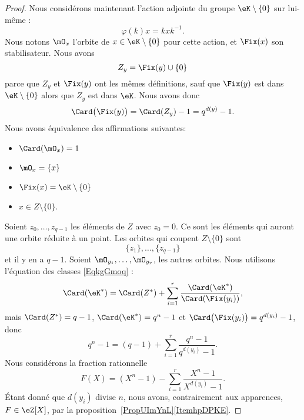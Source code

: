 \begin{proof}
	Nous considérons maintenant l'action adjointe du groupe \( \eK\setminus\{ 0 \}\) sur lui-même :
	\begin{equation}
		\varphi(k)x=kxk^{-1}.
	\end{equation}
	Nous notons \( \mO_x\) l'orbite de \( x\in \eK\setminus\{ 0 \}\) pour cette action, et \( \Fix(x)\) son stabilisateur. Nous avons
	\begin{equation}
		Z_y=\Fix(y)\cup\{ 0 \}
	\end{equation}
	parce que \( Z_y\) et \( \Fix(y)\) ont les mêmes définitions, sauf que \( \Fix(y)\) est dans \( \eK\setminus\{ 0 \}\) alors que \( Z_y\) est dans \( \eK\). Nous avons donc
	\begin{equation}
		\Card\big( \Fix(y) \big)=\Card(Z_y)-1=q^{d(y)}-1.
	\end{equation}
	Nous avons équivalence des affirmations suivantes:
	\begin{itemize}
		\item
		      \( \Card(\mO_x)=1\)
		\item
		      \( \mO_x=\{ x \}\)
		\item
		      \( \Fix(x)=\eK\setminus\{ 0 \}\)
		\item
		      \( x\in Z\setminus\{ 0 \}\).
	\end{itemize}
	Soient \( z_0,\ldots, z_{q-1}\) les éléments de \( Z\) avec \( z_0=0\). Ce sont les éléments qui auront une orbite réduite à un point. Les orbites qui coupent \( Z\setminus\{ 0 \}\) sont
	\begin{equation}
		\{ z_1 \},\ldots, \{ z_{q-1} \}
	\end{equation}
	et il y en a \( q-1\). Soient \( \mO_{y_1},\ldots, \mO_{y_r}\), les autres orbites. Nous utilisons l'équation des classes \eqref{EqkgGmoq} :
	\begin{equation}
		\Card(\eK^*)=\Card(Z^*)+\sum_{i=1}^{r}\frac{ \Card(\eK^*) }{ \Card(\Fix(y_i)) },
	\end{equation}
	mais \( \Card(Z^*)=q-1\), \( \Card(\eK^*)=q^n-1\) et \( \Card\big( \Fix(y_i) \big)=q^{d(y_i)}-1\), donc
	\begin{equation}        \label{EqBPBDzE}
		q^n-1=(q-1)+\sum_{i=1}^{r}\frac{ q^n-1 }{ q^{d(y_i)}-1 }.
	\end{equation}
	Nous considérons la fraction rationnelle
	\begin{equation}        \label{EqATGciu}
		F(X)=(X^n-1)-\sum_{i=1}^{r}\frac{ X^n-1 }{ X^{d(y_i)}-1 }.
	\end{equation}
	Étant donné que \( d(y_i)\) divise \( n\), nous avons, contrairement aux apparences, \( F\in \eZ[X]\), par la proposition~\ref{PropUImYnL}\ref{ItemhpDPKE}.


\end{proof}
